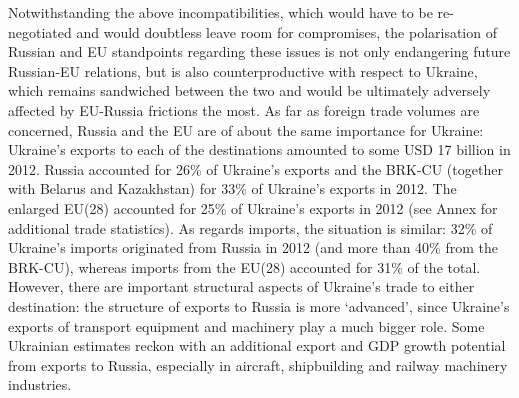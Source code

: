 \addtocounter{footnote}{4}

\clearpage\newpage






Notwithstanding the above incompatibilities, which would have to be re-negotiated and would doubtless leave room for compromises, the polarisation of Russian and EU standpoints regarding these issues is not only endangering future Russian-EU relations, but is also counterproductive with respect to Ukraine, which remains sandwiched between the two and would be ultimately adversely affected by EU-Russia frictions the most. As far as foreign trade volumes are concerned, Russia and the EU are of about the same importance for Ukraine: Ukraine's exports to each of the destinations amounted to some USD 17 billion in 2012. Russia accounted for 26\% of Ukraine's exports and the BRK-CU (together with Belarus and Kazakhstan) for 33\% of Ukraine's exports in 2012. The enlarged EU(28) accounted for 25\% of Ukraine's exports in 2012 (see Annex for additional trade statistics). As regards imports, the situation is similar: 32\% of Ukraine's imports originated from Russia in 2012 (and more than 40\% from the BRK-CU), whereas imports from the EU(28) accounted for 31\% of the total. However, there are important structural aspects of Ukraine's trade to either destination: the structure of exports to Russia is more `advanced', since Ukraine's exports of transport equipment and machinery play a much bigger role. Some Ukrainian estimates reckon with an additional export and GDP growth potential from exports to Russia, especially in aircraft, shipbuilding and railway machinery industries.

